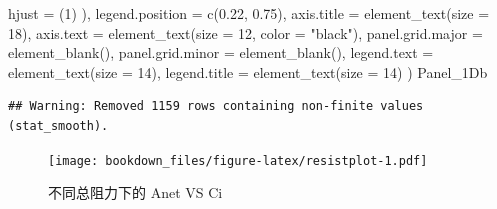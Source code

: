 \documentclass[
]{krantz}
\makeatletter
\newenvironment{Shaded}{\begin{snugshade}}{\end{snugshade}}
\newcommand{\AttributeTok}[1]{\textcolor[rgb]{0.77,0.63,0.00}{#1}}
\newcommand{\DecValTok}[1]{\textcolor[rgb]{0.00,0.00,0.81}{#1}}
\newcommand{\FloatTok}[1]{\textcolor[rgb]{0.00,0.00,0.81}{#1}}
\newcommand{\FunctionTok}[1]{\textcolor[rgb]{0.00,0.00,0.00}{#1}}
\newcommand{\NormalTok}[1]{#1}
\newcommand{\StringTok}[1]{\textcolor[rgb]{0.31,0.60,0.02}{#1}}
\newenvironment{kframe}{%
\medskip{}
\setlength{\fboxsep}{.8em}
 \def\at@end@of@kframe{}%
 \ifinner\ifhmode%
  \def\at@end@of@kframe{\end{minipage}}%
  \begin{minipage}{\columnwidth}%
 \fi\fi%
 \def\FrameCommand##1{\hskip\@totalleftmargin \hskip-\fboxsep
 \colorbox{shadecolor}{##1}\hskip-\fboxsep
     \hskip-\linewidth \hskip-\@totalleftmargin \hskip\columnwidth}%
 \MakeFramed {\advance\hsize-\width
   \@totalleftmargin\z@ \linewidth\hsize
   \@setminipage}}%
 {\par\unskip\endMakeFramed%
 \at@end@of@kframe}
\renewenvironment{Shaded}{\begin{kframe}}{\end{kframe}}
\makeatother
\begin{document}
\begin{Shaded}
\begin{Highlighting}[]
        \AttributeTok{hjust =}\NormalTok{ (}\DecValTok{1}\NormalTok{)}
\NormalTok{      ),}
    \AttributeTok{legend.position =} \FunctionTok{c}\NormalTok{(}\FloatTok{0.22}\NormalTok{, }\FloatTok{0.75}\NormalTok{),}
    \AttributeTok{axis.title =} \FunctionTok{element\_text}\NormalTok{(}\AttributeTok{size =} \DecValTok{18}\NormalTok{),}
    \AttributeTok{axis.text =} \FunctionTok{element\_text}\NormalTok{(}\AttributeTok{size =} \DecValTok{12}\NormalTok{, }\AttributeTok{color =} \StringTok{"black"}\NormalTok{),}
    \AttributeTok{panel.grid.major =} \FunctionTok{element\_blank}\NormalTok{(),}
    \AttributeTok{panel.grid.minor =} \FunctionTok{element\_blank}\NormalTok{(),}
    \AttributeTok{legend.text =} \FunctionTok{element\_text}\NormalTok{(}\AttributeTok{size =} \DecValTok{14}\NormalTok{),}
    \AttributeTok{legend.title =} \FunctionTok{element\_text}\NormalTok{(}\AttributeTok{size =} \DecValTok{14}\NormalTok{)}
\NormalTok{  )}
\NormalTok{Panel\_1Db}
\end{Highlighting}
\end{Shaded}

\begin{verbatim}
## Warning: Removed 1159 rows containing non-finite values (stat_smooth).
\end{verbatim}

\begin{figure}
\centering
\texttt{[image: bookdown\_files/figure-latex/resistplot-1.pdf]}
\caption{\label{fig:resistplot}不同总阻力下的 Anet VS Ci}
\end{figure}
\end{document}
